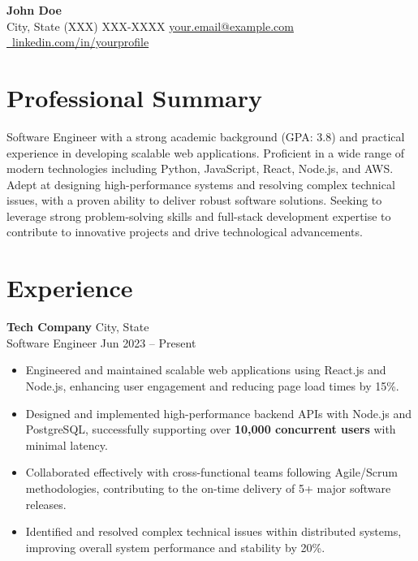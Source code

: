 \documentclass[letterpaper,11pt]{article}
\begin{document}
\begin{center}
    \textbf{\Huge John Doe} \\
    \vspace{2pt}
    \normalsize City, State \quad \textperiodcentered \quad (XXX) XXX-XXXX \quad \textperiodcentered \quad \href{mailto:your.email@example.com}{your.email@example.com} \quad \textperiodcentered \quad \href{https://linkedin.com/in/yourprofile}{\faLinkedinSquare \ linkedin.com/in/yourprofile}
\end{center}
\vspace{-10pt} %

\section*{Professional Summary}
Software Engineer with a strong academic background (GPA: 3.8) and practical experience in developing scalable web applications. Proficient in a wide range of modern technologies including Python, JavaScript, React, Node.js, and AWS. Adept at designing high-performance systems and resolving complex technical issues, with a proven ability to deliver robust software solutions. Seeking to leverage strong problem-solving skills and full-stack development expertise to contribute to innovative projects and drive technological advancements.
\vspace{-5pt} %

\section*{Experience}
\textbf{Tech Company} \hfill City, State \\
Software Engineer \hfill Jun 2023 – Present
\begin{itemize}
    \item Engineered and maintained scalable web applications using React.js and Node.js, enhancing user engagement and reducing page load times by 15\%.
    \item Designed and implemented high-performance backend APIs with Node.js and PostgreSQL, successfully supporting over \textbf{10,000 concurrent users} with minimal latency.
    \item Collaborated effectively with cross-functional teams following Agile/Scrum methodologies, contributing to the on-time delivery of 5+ major software releases.
    \item Identified and resolved complex technical issues within distributed systems, improving overall system performance and stability by 20\%.
\end{itemize}
\vspace{-5pt} %
\end{document}
